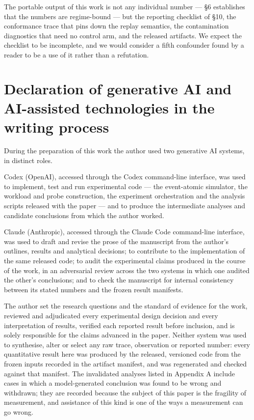 \documentclass[
  10pt,
  letterpaper,
  10pt]{article}
\begin{document}
The portable output of this work is not any individual number --- §6
establishes that the numbers are regime-bound --- but the reporting
checklist of §10, the conformance trace that pins down the replay
semantics, the contamination diagnostics that need no control arm, and
the released artifacts. We expect the checklist to be incomplete, and we
would consider a fifth confounder found by a reader to be a use of it
rather than a refutation.

\section{Declaration of generative AI and AI-assisted technologies in
the writing
process}\label{declaration-of-generative-ai-and-ai-assisted-technologies-in-the-writing-process}

During the preparation of this work the author used two generative AI
systems, in distinct roles.

Codex (OpenAI), accessed through the Codex command-line interface, was
used to implement, test and run experimental code --- the event-atomic
simulator, the workload and probe construction, the experiment
orchestration and the analysis scripts released with the paper --- and
to produce the intermediate analyses and candidate conclusions from
which the author worked.

Claude (Anthropic), accessed through the Claude Code command-line
interface, was used to draft and revise the prose of the manuscript from
the author's outlines, results and analytical decisions; to contribute
to the implementation of the same released code; to audit the
experimental claims produced in the course of the work, in an
adversarial review across the two systems in which one audited the
other's conclusions; and to check the manuscript for internal
consistency between its stated numbers and the frozen result manifests.

The author set the research questions and the standard of evidence for
the work, reviewed and adjudicated every experimental design decision
and every interpretation of results, verified each reported result
before inclusion, and is solely responsible for the claims advanced in
the paper. Neither system was used to synthesise, alter or select any
raw trace, observation or reported number: every quantitative result
here was produced by the released, versioned code from the frozen inputs
recorded in the artifact manifest, and was regenerated and checked
against that manifest. The invalidated analyses listed in Appendix A
include cases in which a model-generated conclusion was found to be
wrong and withdrawn; they are recorded because the subject of this paper
is the fragility of measurement, and assistance of this kind is one of
the ways a measurement can go wrong.
\end{document}
